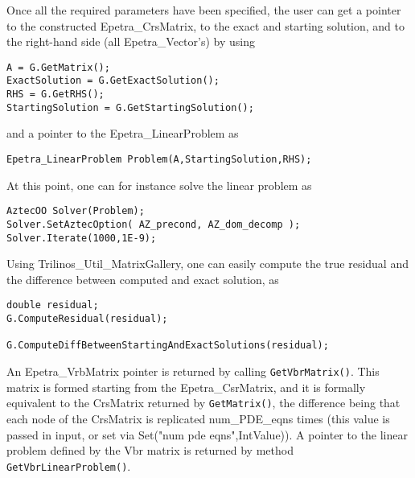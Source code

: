 

  


\bigskip

Once all the required parameters have been specified, the user can get a
pointer to the constructed Epetra\_CrsMatrix, to the exact and starting
solution, and to the right-hand side (all Epetra\_Vector's) by using
\begin{verbatim}
A = G.GetMatrix();
ExactSolution = G.GetExactSolution();
RHS = G.GetRHS();
StartingSolution = G.GetStartingSolution();
\end{verbatim}
and a pointer to the Epetra\_LinearProblem as
\begin{verbatim}  
Epetra_LinearProblem Problem(A,StartingSolution,RHS);
\end{verbatim}
At this point, one can for instance solve the linear problem as
\begin{verbatim}  
AztecOO Solver(Problem);
Solver.SetAztecOption( AZ_precond, AZ_dom_decomp );  
Solver.Iterate(1000,1E-9);
\end{verbatim}
Using Trilinos\_Util\_MatrixGallery, one can easily compute the true
residual and the difference between computed and exact solution, as
\begin{verbatim} 
double residual;
G.ComputeResidual(residual);
  
G.ComputeDiffBetweenStartingAndExactSolutions(residual);
\end{verbatim}

An Epetra\_VrbMatrix pointer is returned by calling
\verb!GetVbrMatrix()!.  This matrix is formed starting from the
Epetra\_CsrMatrix, and it is formally equivalent to the CrsMatrix
returned by \verb!GetMatrix()!, the difference being that each node of
the CrsMatrix is replicated num\_PDE\_eqns times (this value is passed in
input, or set via Set("num pde eqns",IntValue)). 
A pointer to the linear problem defined by the Vbr matrix is returned by
method \verb!GetVbrLinearProblem()!.

